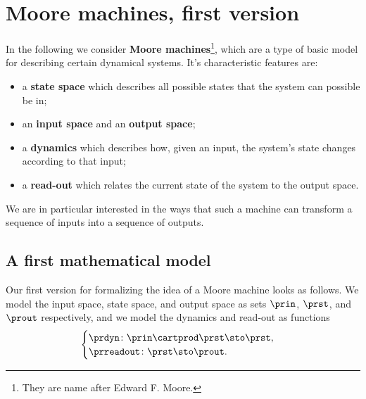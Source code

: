 
\section{Moore machines, first version}
\label{sec:moore-machines}



In the following we consider \textbf{Moore machines}\footnote{They are name after Edward F.
    Moore.
}, which are a type of basic model for describing certain dynamical systems.
It's characteristic features are:
\begin{itemize}
    \item a \textbf{state space} which describes all possible states that the system can possible be in;
    \item an \textbf{input space} and an \textbf{output space};
    \item a \textbf{dynamics} which describes how, given an input, the system's state changes according to that input;
    \item a \textbf{read-out} which relates the current state of the system to the output space.
\end{itemize}
%
We are in particular interested in the ways that such a machine can transform a sequence of inputs into a sequence of outputs.

\subsection{A first mathematical model}

Our first version for formalizing the idea of a Moore machine looks as follows.
We model the input space, state space, and output space as sets  $\prin$, $\prst$, and $\prout$ respectively, and we model the dynamics and read-out as functions
\begin{equation}
    \label{eq:moore-1}
    \begin{cases}
        \prdyn \colon \prin \cartprod \prst \sto \prst, \\
        \prreadout \colon \prst \sto \prout.
    \end{cases}
\end{equation}


